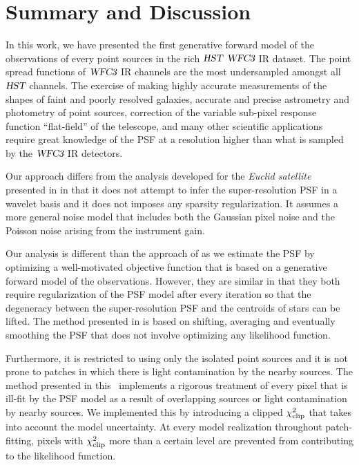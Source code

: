 \section{Summary and Discussion}\label{sec:hstsummary}

In this work, we have presented the first generative forward model of the observations of every point sources in the rich ${\textsl{HST}}$ ${\textsl{WFC3}}$ IR dataset. 
The point spread functions of ${\textsl{WFC3}}$ IR channels are the most undersampled amongst all ${\textsl{HST}}$ channels. 
The exercise of making highly accurate measurements of the shapes of faint and poorly resolved galaxies, accurate and precise astrometry and photometry of point sources, 
correction of the variable sub-pixel response function ``flat-field'' of the telescope, and many other scientific applications require great knowledge of 
the PSF at a resolution higher than what is sampled by the ${\textsl{WFC3}}$ IR detectors. 

Our approach differs from the analysis developed for the \emph{Euclid satellite} presented in \citet{ngole,ngole2} in that it does not attempt to infer the super-resolution PSF in a wavelet basis and it does not imposes any sparsity regularization. It assumes a more general noise model that includes both the Gaussian pixel noise and the Poisson noise arising from the instrument gain.

Our analysis is different than the approach of \citet{anderson2000} as we estimate the PSF by optimizing a well-motivated objective function 
that is based on a generative forward model of the observations. However, they are similar in that they both require regularization of the PSF model after every iteration so that the degeneracy between the super-resolution PSF and the centroids of stars can be lifted. 
The method presented in \citet{anderson2000} is based on shifting, averaging and eventually smoothing the PSF that does not involve optimizing any likelihood function.

Furthermore, it is restricted to using only the isolated point sources and it is not prone to patches in which there is light contamination by the nearby sources. 
The method presented in this \paper\ implements a rigorous treatment of every pixel that is ill-fit by the PSF model as a result of overlapping sources or light contamination by nearby sources. We implemented this by introducing a clipped $\chi^{2}_{\rm clip}$ that takes into account the model uncertainty. At every model realization throughout patch-fitting, pixels with $\chi^{2}_{\rm clip}$ more than a certain level are prevented from contributing to the likelihood function.

